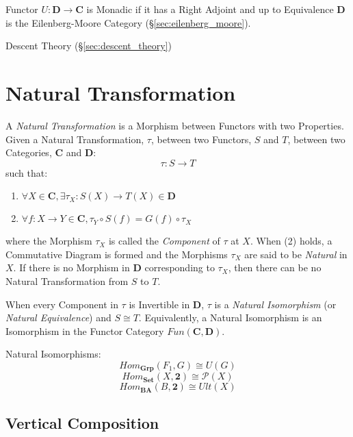 Functor $U : \mathbf{D} \rightarrow \mathbf{C}$ is Monadic if it has a
Right Adjoint and up to Equivalence $\mathbf{D}$ is the
Eilenberg-Moore Category (\S\ref{sec:eilenberg_moore}).
\cite{lambek-scott88}

Descent Theory (\S\ref{sec:descent_theory})



\section{Natural Transformation}\label{sec:natural_transformation}

A \emph{Natural Transformation} is a Morphism between Functors with
two Properties. Given a Natural Transformation, $\tau$, between two
Functors, $S$ and $T$, between two Categories, $\mathbf{C}$ and
$\mathbf{D}$:
\[
  \tau : S \rightarrow T
\]
such that:
\begin{enumerate}
  \item $\forall X \in \mathbf{C},
    \exists \tau_X : S(X) \rightarrow T(X) \in \mathbf{D}$
  \item $\forall f : X \rightarrow Y \in \mathbf{C},
    \tau_Y \circ S(f) = G(f) \circ \tau_X$
\end{enumerate}
where the Morphism $\tau_X$ is called the \emph{Component} of $\tau$
at $X$. When (2) holds, a Commutative Diagram is formed and the
Morphisms $\tau_X$ are said to be \emph{Natural} in $X$. If there is
no Morphism in $\mathbf{D}$ corresponding to $\tau_X$, then there can
be no Natural Transformation from $S$ to $T$.

When every Component in $\tau$ is Invertible in $\mathbf{D}$, $\tau$
is a \emph{Natural Isomorphism} (or \emph{Natural Equivalence}) and $S
\cong T$. Equivalently, a Natural Isomorphism is an Isomorphism in the
Functor Category $Fun(\mathbf{C},\mathbf{D})$.

Natural Isomorphisms:
\[
  Hom_\mathbf{Grp}(F_1,G) \cong U(G)
\]\[
  Hom_\mathbf{Set}(X,\mathbf{2}) \cong \mathcal{P}(X)
\]\[
  Hom_\mathbf{BA}(B,\mathbf{2}) \cong Ult(X)
\]



\subsection{Vertical Composition}\label{sec:vertical_composition}

